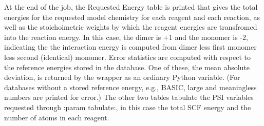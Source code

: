 \documentclass[letterpaper,10pt,english]{sphinxmanual}
\begin{document}
At the end of the job, the Requested Energy table is printed that gives the total
energies for the requested model chemistry for each reagent and each reaction, as
well as the stoichoimetric weights by which the reagent energies are transfromed
into the reaction energy. In this case, the dimer is +1 and the monomer is -2,
indicating the the interaction energy is computed from dimer less first monomer
less second (identical) monomer. Error statistics are computed with respect to the reference
energies stored in the database. One of these, the mean absolute deviation, is
returned by the wrapper as an ordinary Python variable. (For databases
without a stored reference energy, e.g., BASIC, large and meaningless numbers are
printed for error.) The other two tables tabulate the PSI variables requested
through :param tabulate:, in this case the total SCF energy and the number
of atoms in each reagent.
\end{document}
